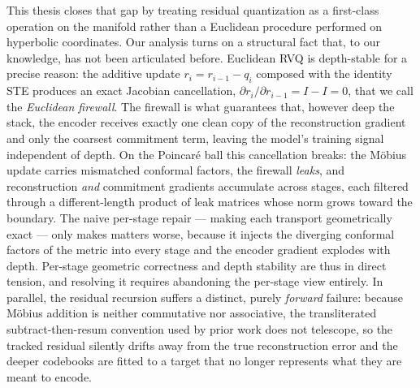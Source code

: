 \documentclass[12pt]{report}
\begin{document}
This thesis closes that gap by treating residual quantization as a first-class operation on the manifold rather than a Euclidean procedure performed on hyperbolic coordinates. Our analysis turns on a structural fact that, to our knowledge, has not been articulated before. Euclidean RVQ is depth-stable for a precise reason: the additive update $r_i = r_{i-1}-q_i$ composed with the identity STE produces an exact Jacobian cancellation, $\partial r_i/\partial r_{i-1}=I-I=0$, that we call the \emph{Euclidean firewall}. The firewall is what guarantees that, however deep the stack, the encoder receives exactly one clean copy of the reconstruction gradient and only the coarsest commitment term, leaving the model's training signal independent of depth. On the Poincar\'e ball this cancellation breaks: the M\"obius update carries mismatched conformal factors, the firewall \emph{leaks}, and reconstruction \emph{and} commitment gradients accumulate across stages, each filtered through a different-length product of leak matrices whose norm grows toward the boundary. The naive per-stage repair --- making each transport geometrically exact --- only makes matters worse, because it injects the diverging conformal factors of the metric into every stage and the encoder gradient explodes with depth. Per-stage geometric correctness and depth stability are thus in direct tension, and resolving it requires abandoning the per-stage view entirely. In parallel, the residual recursion suffers a distinct, purely \emph{forward} failure: because M\"obius addition is neither commutative nor associative, the transliterated subtract-then-resum convention used by prior work does not telescope, so the tracked residual silently drifts away from the true reconstruction error and the deeper codebooks are fitted to a target that no longer represents what they are meant to encode.
\end{document}
